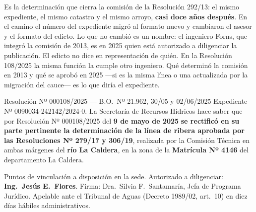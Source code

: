 \begin{cautela}
Es la determinación que cierra la comisión de la Resolución 292/13: el mismo expediente, el mismo catastro y el mismo arroyo, \textbf{casi doce años después}. En el camino el número del expediente migró al formato nuevo y cambiaron el asesor y el formato del edicto. Lo que no cambió es un nombre: el ingeniero Forns, que integró la comisión de 2013, es en 2025 quien está autorizado a diligenciar la publicación. El edicto no dice en representación de quién. En la Resolución 108/2025 la misma función la cumple otro ingeniero. Qué determinó la comisión en 2013 y qué se aprobó en 2025 ---si es la misma línea o una actualizada por la migración del cauce--- es lo que diría el expediente. 
\end{cautela}

\begin{ficha}{Resolución Nº 000108/2025 --- B.O.\ Nº 21.962, 30/05 y 02/06/2025}
Expediente Nº 0090034-242142/2024-0. La Secretaría de Recursos Hídricos hace saber que por Resolución Nº 000108/2025 del \textbf{9 de mayo de 2025} \textbf{se rectificó en su parte pertinente la determinación de la línea de ribera aprobada por las Resoluciones Nº 279/17 y 306/19}, realizada por la Comisión Técnica en ambas márgenes del \textbf{río La Caldera}, en la zona de la \textbf{Matrícula Nº 4146} del departamento La Caldera.

Puntos de vinculación a disposición en la sede. Autorizado a diligenciar: \textbf{Ing.\ Jesús E.\ Flores}. Firma: Dra.\ Silvia F.\ Santamaría, Jefa de Programa Jurídico. Apelable ante el Tribunal de Aguas (Decreto 1989/02, art.\ 10) en diez días hábiles administrativos.
\end{ficha}

